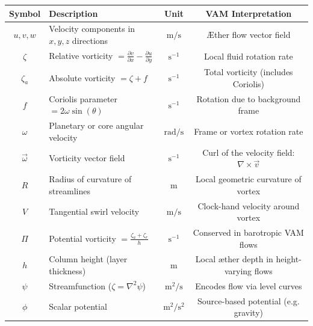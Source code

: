 \documentclass[a4paper,12pt]{article}
\begin{document}
    \begin{table}[H]
        \centering
        \footnotesize
        \renewcommand{\arraystretch}{1.4}
        \begin{tabular}{|c|l|c|c|}
            \hline
            \textbf{Symbol} & \textbf{Description} & \textbf{Unit} & \textbf{VAM Interpretation} \\
            \hline
            $u, v, w$      & Velocity components in $x, y, z$ directions & $\mathrm{m/s}$ & Æther flow vector field \\
            \hline
            $\zeta$        & Relative vorticity $= \frac{\partial v}{\partial x} - \frac{\partial u}{\partial y}$ & $\mathrm{s}^{-1}$ & Local fluid rotation rate \\
            \hline
            $\zeta_a$      & Absolute vorticity $= \zeta + f$ & $\mathrm{s}^{-1}$ & Total vorticity (includes Coriolis) \\
            \hline
            $f$            & Coriolis parameter $= 2\omega \sin(\theta)$ & $\mathrm{s}^{-1}$ & Rotation due to background frame \\
            \hline
            $\omega$       & Planetary or core angular velocity & $\mathrm{rad/s}$ & Frame or vortex rotation rate \\
            \hline
            $\vec{\omega}$ & Vorticity vector field & $\mathrm{s}^{-1}$ & Curl of the velocity field: $\nabla \times \vec{v}$ \\
            \hline
            $R$            & Radius of curvature of streamlines & $\mathrm{m}$ & Local geometric curvature of vortex \\
            \hline
            $V$            & Tangential swirl velocity & $\mathrm{m/s}$ & Clock-hand velocity around vortex \\
            \hline
            $\Pi$          & Potential vorticity $= \frac{\zeta_a + \zeta_r}{h}$ & $\mathrm{s}^{-1}$ & Conserved in barotropic VAM flows \\
            \hline
            $h$            & Column height (layer thickness) & $\mathrm{m}$ & Local æther depth in height-varying flows \\
            \hline
            $\psi$         & Streamfunction ($\zeta = \nabla^2 \psi$) & $\mathrm{m^2/s}$ & Encodes flow via level curves \\
            \hline
            $\phi$         & Scalar potential & $\mathrm{m^2/s^2}$ & Source-based potential (e.g. gravity) \\
            \hline

\end{tabular}
\end{table}
\end{document}
